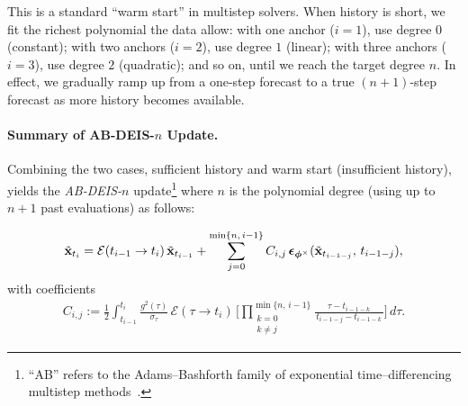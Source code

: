 This is a standard ``warm start'' in multistep solvers. When history is short, we fit the richest polynomial the data allow: with one anchor ($i{=}1$), use degree $0$ (constant); with two anchors ($i{=}2$), use degree $1$ (linear); with three anchors ($i{=}3$), use degree $2$ (quadratic); and so on, until we reach the target degree $n$. In effect, we gradually ramp up from a one-step forecast to a true $(n{+}1)$-step forecast as more history becomes available.



\paragraph{Summary of AB-DEIS-$n$ Update.}
Combining the two cases, sufficient history and warm start (insufficient history), yields the
\emph{AB-DEIS-$n$} update\footnote{``AB'' refers to the Adams–Bashforth family of exponential
time–differencing multistep methods~\citep{hochbruck2010exponential}.} where $n$ is the polynomial
degree (using up to $n{+}1$ past evaluations) as follows:
\begin{mdframed}
\begin{align*}
\tilde{{\mathbf{x}}}_{t_i}
= \mathcal{E}(t_{i-1} \to t_i)\,\tilde{{\mathbf{x}}}_{t_{i-1}}
+ \sum_{j=0}^{\min\{n,\, i-1\}} C_{i,j}\,{\bm{\epsilon}}_{\bm{\phi}^\times}(\tilde{{\mathbf{x}}}_{t_{i-1-j}},\,t_{i-1-j}),
\end{align*}
with coefficients
\begin{align*}
C_{i,j}
:= \frac{1}{2} \int_{t_{i-1}}^{t_i}
\frac{g^2(\tau)}{\sigma_\tau}\,\mathcal{E}(\tau \to t_i)\,
\Bigg[\prod_{\substack{k=0\\k\neq j}}^{\min\{n,\, i-1\}}
\frac{\tau - t_{i-1-k}}{\,t_{i-1-j} - t_{i-1-k}\,}\Bigg]\,d\tau.
\end{align*}
\end{mdframed}

